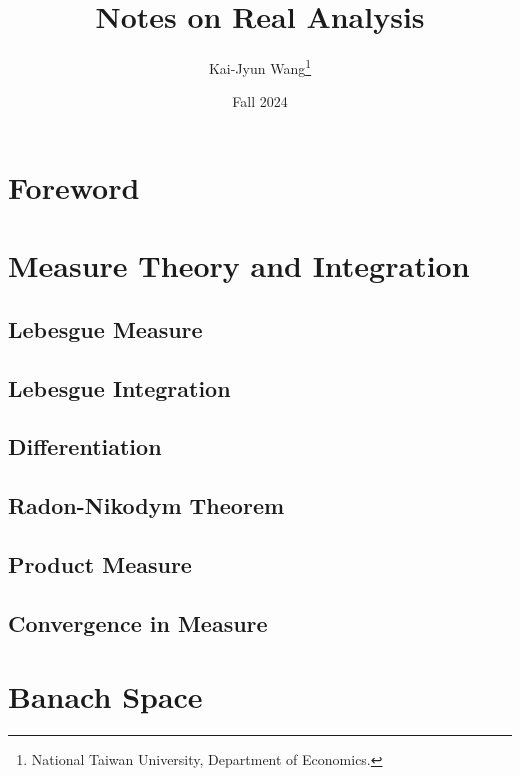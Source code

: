 \documentclass[a4paper, 12pt]{article}
\title{Notes on Real Analysis}
\author{Kai-Jyun Wang\thanks{National Taiwan University, Department of Economics.}}
\date{Fall 2024}
\begin{document}
 
\maketitle

\section*{Foreword}


\newpage
\tableofcontents
\newpage

\section{Measure Theory and Integration}

\subsection{Lebesgue Measure}

\newpage

\subsection{Lebesgue Integration}

\newpage

\subsection{Differentiation}

\newpage

\subsection{Radon-Nikodym Theorem}

\newpage

\subsection{Product Measure}

\newpage

\subsection{Convergence in Measure}

\newpage

\section{Banach Space}
\end{document}
